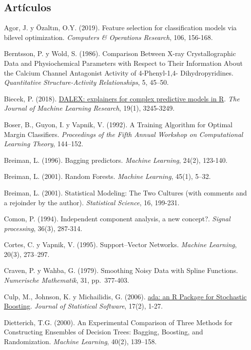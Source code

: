 \documentclass[
]{book}
\theoremstyle{break}
\theoremstyle{definition}
\theoremstyle{definition}
\theoremstyle{definition}
\theoremstyle{definition}
\theoremstyle{remark}
\begin{document}
\hypertarget{artuxedculos}{%
\subsection*{Artículos}\label{artuxedculos}}

Agor, J. y Özaltın, O.Y. (2019). Feature selection for classification models via bilevel optimization. \emph{Computers \& Operations Research}, 106, 156-168.

Berntsson, P. y Wold, S. (1986). Comparison Between X-ray Crystallographic Data and Physiochemical Parameters with Respect to Their Information About the Calcium Channel Antagonist Activity of 4-Phenyl-1,4-
Dihydropyridines. \emph{Quantitative Structure-Activity Relationships}, 5, 45--50.

Biecek, P. (2018). \href{http://www.jmlr.org/papers/volume19/18-416/18-416.pdf}{DALEX: explainers for complex predictive models in R}. \emph{The Journal of Machine Learning Research}, 19(1), 3245-3249.

Boser, B., Guyon, I. y Vapnik, V. (1992). A Training Algorithm for Optimal Margin Classifiers. \emph{Proceedings of the Fifth Annual Workshop on Computational Learning Theory}, 144--152.

Breiman, L. (1996). Bagging predictors. \emph{Machine Learning}, 24(2), 123-140.

Breiman, L. (2001). Random Forests. \emph{Machine Learning}, 45(1), 5--32.

Breiman, L. (2001). Statistical Modeling: The Two Cultures (with comments and a rejoinder by the author). \emph{Statistical Science}, 16, 199-231.

Comon, P. (1994). Independent component analysis, a new concept?. \emph{Signal processing}, 36(3), 287-314.

Cortes, C. y Vapnik, V. (1995). Support--Vector Networks. \emph{Machine Learning}, 20(3), 273--297.

Craven, P. y Wahba, G. (1979). Smoothing Noisy Data with Spline Functions. \emph{Numerische Mathematik}, 31, pp.~377-403.

Culp, M., Johnson, K. y Michailidis, G. (2006). \href{https://www.jstatsoft.org/article/view/v017i02}{ada: an R Package for Stochastic Boosting}. \emph{Journal of Statistical Software}, 17(2), 1-27.

Dietterich, T.G. (2000). An Experimental Comparison of Three Methods for Constructing Ensembles of Decision Trees: Bagging, Boosting, and Randomization. \emph{Machine Learning}, 40(2), 139--158.
\end{document}

